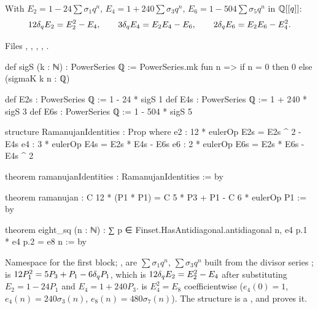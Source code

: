 \begin{theorem}\label{l25:thm:ramanujan}
With $E_2=1-24\sum\sigma_1q^n$, $E_4=1+240\sum\sigma_3q^n$, $E_6=1-504\sum\sigma_5q^n$ in ${\mathbb{Q}}[[q]]$:
\begin{equation*}
12\delta_q E_2=E_2^2-E_4,\qquad 3\delta_q E_4=E_2E_4-E_6,\qquad 2\delta_q E_6=E_2E_6-E_4^2 .
\end{equation*}
\end{theorem}
\noindent Files ,
, ,
, .
\begin{leancode}
def sigS (k : ℕ) : PowerSeries ℚ := PowerSeries.mk fun n => if n = 0 then 0 else (sigmaK k n : ℚ)

def E2s : PowerSeries ℚ := 1 - 24 * sigS 1
def E4s : PowerSeries ℚ := 1 + 240 * sigS 3
def E6s : PowerSeries ℚ := 1 - 504 * sigS 5

structure RamanujanIdentities : Prop where
  e2 : 12 * eulerOp E2s = E2s ^ 2 - E4s
  e4 : 3 * eulerOp E4s = E2s * E4s - E6s
  e6 : 2 * eulerOp E6s = E2s * E6s - E4s ^ 2

theorem ramanujanIdentities : RamanujanIdentities := by
\end{leancode}
\begin{leancode}
theorem ramanujan : C 12 * (P1 * P1) = C 5 * P3 + P1 - C 6 * eulerOp P1 := by

theorem eight_sq (n : ℕ) :
    ∑ p ∈ Finset.HasAntidiagonal.antidiagonal n, e4 p.1 * e4 p.2 = e8 n := by
\end{leancode}
\begin{dictionary}
Namespace  for the first block; ,  are
$\sum\sigma_1q^n$, $\sum\sigma_3q^n$ built from the divisor series ;  is
$12P_1^2=5P_3+P_1-6\delta_q P_1$, which is $12\delta_q E_2=E_2^2-E_4$ after substituting $E_2=1-24P_1$ and
$E_4=1+240P_3$.  is $E_4^2=E_8$ coefficientwise ($e_4(0)=1$, $e_4(n)=240\sigma_3(n)$, $e_8(n)=480\sigma_7(n)$).
The structure  is a , and  proves it.
\end{dictionary}

